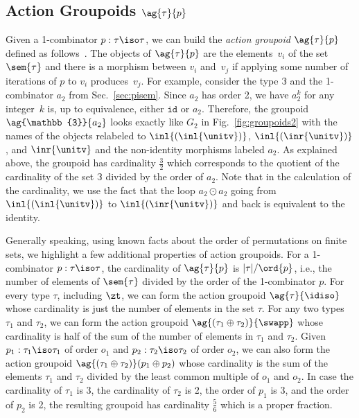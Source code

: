 \subsection{Action Groupoids $\ag{\tau}{p}$}

Given a 1-combinator $p : \tau \iso \tau$, we can build the
\emph{action groupoid} $\ag{\tau}{p}$ defined as
follows~\cite{groupoidintro}. The objects of $\ag{\tau}{p}$ are the
elements~$v_i$ of the set $\sem{\tau}$ and there is a morphism between
$v_i$ and~$v_j$ if applying some number of iterations of $p$ to $v_i$
produces~$v_j$. For example, consider the type $\mathbb{3}$ and the
1-combinator $a_2$ from Sec.~\ref{sec:pisem}. Since $a_2$ has order 2,
we have $a_2 ^ k$ for any integer~$k$ is, up to equivalence, either
$\texttt{id}$ or $a_2$. Therefore, the groupoid $\ag{\mathbb{3}}{a_2}$
looks exactly like $G_2$ in Fig.~\ref{fig:groupoids2} with the names
of the objects relabeled to $\inl{(\inl{\unitv})}$,
$\inl{(\inr{\unitv})}$, and $\inr{\unitv}$ and the non-identity
morphisms labeled $a_2$. As explained above, the groupoid has
cardinality $\frac{3}{2}$ which corresponds to the quotient of the
cardinality of the set $\mathbb{3}$ divided by the order of
$a_2$. Note that in the calculation of the cardinality, we use the
fact that the loop $a_2 \odot a_2$ going from $\inl{(\inl{\unitv})}$
to $\inl{(\inr{\unitv})}$ and back is equivalent to the identity.

Generally speaking, using known facts about the order of permutations
on finite sets, we highlight a few additional properties of action
groupoids. For a 1-combinator $p : \tau \iso \tau$, the cardinality of
$\ag{\tau}{p}$ is $|\tau|/\ord{p}$, i.e., the number of elements of
$\sem{\tau}$ divided by the order of the 1-combinator $p$.  For every
type $\tau$, including $\zt$, we can form the action groupoid
$\ag{\tau}{\idiso}$ whose cardinality is just the number of elements
in the set $\tau$. For any two types $\tau_1$ and $\tau_2$, we can
form the action groupoid $\ag{(\tau_1\oplus\tau_2)}{\swapp}$ whose
cardinality is half of the sum of the number of elements in $\tau_1$
and $\tau_2$. Given $p_1 : \tau_1 \iso \tau_1$ of order $o_1$ and
$p_2 : \tau_2 \iso \tau_2$ of order $o_2$, we can also form the action
groupoid $\ag{(\tau_1\oplus\tau_2)}({p_1\oplus p_2)}$ whose cardinality is
the sum of the elements $\tau_1$ and $\tau_2$ divided by the least
common multiple of $o_1$ and $o_2$. In case the cardinality of
$\tau_1$ is 3, the cardinality of $\tau_2$ is 2, the order of $p_1$ is
3, and the order of $p_2$ is 2, the resulting groupoid has cardinality
$\frac{5}{6}$ which is a proper fraction.

